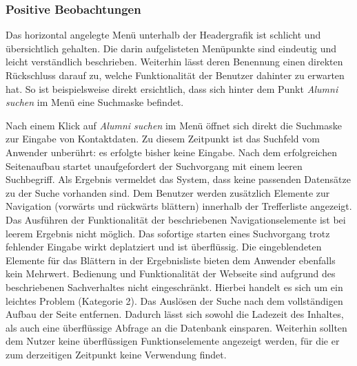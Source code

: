 
\subsubsection*{Positive Beobachtungen}
Das horizontal angelegte Menü unterhalb der Headergrafik ist schlicht und übersichtlich gehalten. Die darin aufgelisteten Menüpunkte sind eindeutig und leicht verständlich beschrieben. Weiterhin lässt deren Benennung einen direkten Rückschluss darauf zu, welche Funktionalität der Benutzer dahinter zu erwarten hat. So ist beispielsweise direkt ersichtlich, dass sich hinter dem Punkt \emph{Alumni suchen} im Menü eine Suchmaske befindet.

{
	Nach einem Klick auf \emph{Alumni suchen} im Menü öffnet sich direkt die Suchmaske zur Eingabe von Kontaktdaten. Zu diesem Zeitpunkt ist das Suchfeld vom Anwender unberührt: es erfolgte bisher keine Eingabe. Nach dem erfolgreichen Seitenaufbau startet unaufgefordert der Suchvorgang mit einem leeren Suchbegriff. Als Ergebnis vermeldet das System, dass keine passenden Datensätze zu der Suche vorhanden sind. Dem Benutzer werden zusätzlich Elemente zur Navigation (vorwärts und rückwärts blättern) innerhalb der Trefferliste angezeigt. Das Ausführen der Funktionalität der beschriebenen Navigationselemente ist bei leerem Ergebnis nicht möglich.
}
{
	Das sofortige starten eines Suchvorgang trotz fehlender Eingabe wirkt deplatziert und ist überflüssig. Die eingeblendeten Elemente für das Blättern in der Ergebnisliste bieten dem Anwender ebenfalls kein Mehrwert. Bedienung und Funktionalität der Webseite sind aufgrund des beschriebenen Sachverhaltes nicht eingeschränkt. Hierbei handelt es sich um ein leichtes Problem (Kategorie 2).
}
{
	Das Auslösen der Suche nach dem vollständigen Aufbau der Seite entfernen. Dadurch lässt sich sowohl die Ladezeit des Inhaltes, als auch eine überflüssige Abfrage an die Datenbank einsparen. Weiterhin sollten dem Nutzer keine überflüssigen Funktionselemente angezeigt werden, für die er zum derzeitigen Zeitpunkt keine Verwendung findet.
} 



